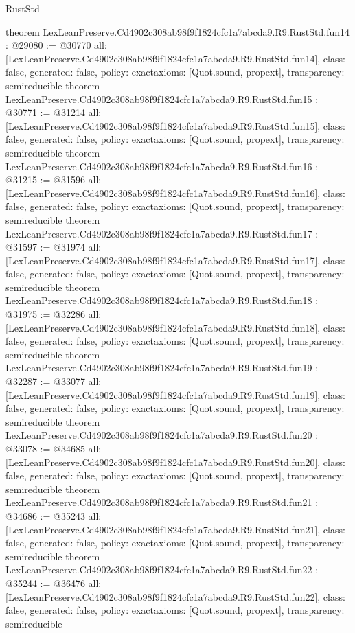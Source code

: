 \begin{lexlean}{RustStd}
\begin{coremodule}
{}
theorem LexLeanPreserve.Cd4902c308ab98f9f1824cfc1a7abcda9.R9.RustStd.fun14 : @29080 := @30770 {
  all: [LexLeanPreserve.Cd4902c308ab98f9f1824cfc1a7abcda9.R9.RustStd.fun14],
  class: false,
  generated: false,
  policy: exact{axioms: [Quot.sound, propext]},
  transparency: semireducible
}
theorem LexLeanPreserve.Cd4902c308ab98f9f1824cfc1a7abcda9.R9.RustStd.fun15 : @30771 := @31214 {
  all: [LexLeanPreserve.Cd4902c308ab98f9f1824cfc1a7abcda9.R9.RustStd.fun15],
  class: false,
  generated: false,
  policy: exact{axioms: [Quot.sound, propext]},
  transparency: semireducible
}
theorem LexLeanPreserve.Cd4902c308ab98f9f1824cfc1a7abcda9.R9.RustStd.fun16 : @31215 := @31596 {
  all: [LexLeanPreserve.Cd4902c308ab98f9f1824cfc1a7abcda9.R9.RustStd.fun16],
  class: false,
  generated: false,
  policy: exact{axioms: [Quot.sound, propext]},
  transparency: semireducible
}
theorem LexLeanPreserve.Cd4902c308ab98f9f1824cfc1a7abcda9.R9.RustStd.fun17 : @31597 := @31974 {
  all: [LexLeanPreserve.Cd4902c308ab98f9f1824cfc1a7abcda9.R9.RustStd.fun17],
  class: false,
  generated: false,
  policy: exact{axioms: [Quot.sound, propext]},
  transparency: semireducible
}
theorem LexLeanPreserve.Cd4902c308ab98f9f1824cfc1a7abcda9.R9.RustStd.fun18 : @31975 := @32286 {
  all: [LexLeanPreserve.Cd4902c308ab98f9f1824cfc1a7abcda9.R9.RustStd.fun18],
  class: false,
  generated: false,
  policy: exact{axioms: [Quot.sound, propext]},
  transparency: semireducible
}
theorem LexLeanPreserve.Cd4902c308ab98f9f1824cfc1a7abcda9.R9.RustStd.fun19 : @32287 := @33077 {
  all: [LexLeanPreserve.Cd4902c308ab98f9f1824cfc1a7abcda9.R9.RustStd.fun19],
  class: false,
  generated: false,
  policy: exact{axioms: [Quot.sound, propext]},
  transparency: semireducible
}
theorem LexLeanPreserve.Cd4902c308ab98f9f1824cfc1a7abcda9.R9.RustStd.fun20 : @33078 := @34685 {
  all: [LexLeanPreserve.Cd4902c308ab98f9f1824cfc1a7abcda9.R9.RustStd.fun20],
  class: false,
  generated: false,
  policy: exact{axioms: [Quot.sound, propext]},
  transparency: semireducible
}
theorem LexLeanPreserve.Cd4902c308ab98f9f1824cfc1a7abcda9.R9.RustStd.fun21 : @34686 := @35243 {
  all: [LexLeanPreserve.Cd4902c308ab98f9f1824cfc1a7abcda9.R9.RustStd.fun21],
  class: false,
  generated: false,
  policy: exact{axioms: [Quot.sound, propext]},
  transparency: semireducible
}
theorem LexLeanPreserve.Cd4902c308ab98f9f1824cfc1a7abcda9.R9.RustStd.fun22 : @35244 := @36476 {
  all: [LexLeanPreserve.Cd4902c308ab98f9f1824cfc1a7abcda9.R9.RustStd.fun22],
  class: false,
  generated: false,
  policy: exact{axioms: [Quot.sound, propext]},
  transparency: semireducible
}
\end{coremodule}
\end{lexlean}
